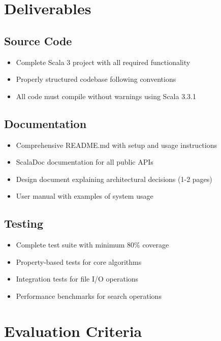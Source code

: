 \documentclass[11pt,a4paper]{article}
\begin{document}
\section{Deliverables}

\subsection{Source Code}
\begin{itemize}
    \item Complete Scala 3 project with all required functionality
    \item Properly structured codebase following conventions
    \item All code must compile without warnings using Scala 3.3.1
\end{itemize}

\subsection{Documentation}
\begin{itemize}
    \item Comprehensive README.md with setup and usage instructions
    \item ScalaDoc documentation for all public APIs
    \item Design document explaining architectural decisions (1-2 pages)
    \item User manual with examples of system usage
\end{itemize}

\subsection{Testing}
\begin{itemize}
    \item Complete test suite with minimum 80\% coverage
    \item Property-based tests for core algorithms
    \item Integration tests for file I/O operations
    \item Performance benchmarks for search operations
\end{itemize}

\section{Evaluation Criteria}
\end{document}
